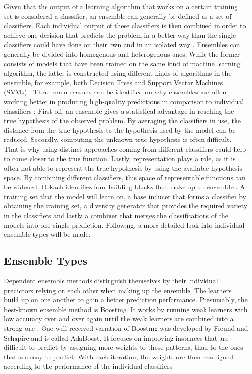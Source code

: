Given that the output of a learning algorithm that works on a certain training set is considered a classifier, an ensemble can generally be defined as a set of classifiers. Each individual output of these classifiers is then combined in order to achieve one decision that predicts the problem in a better way than the single classifiers could have done on their own and in an isolated way \cite{dietterich2000}. Ensembles can generally be divided into homogenous and heterogenous ones. While the former consists of models that have been trained on the same kind of machine learning algorithm, the latter is constructed using different kinds of algorithms in the ensemble, for example, both Decision Trees and Support Vector Machines (SVMs) \cite{zhou2012}. Three main reasons can be identified on why ensembles are often working better in producing high-quality predictions in comparison to individual classifiers \cite{dietterich2000}: First off, an ensemble gives a statistical advantage in reaching the true hypothesis of the observed problem. By averaging the classifiers in use, the distance from the true hypothesis to the hypothesis used by the model can be reduced. Secondly, computing the unknown true hypothesis is often difficult. That is why using distinct approaches coming from different classifiers could help to come closer to the true function. Lastly, representation plays a role, as it is often not able to represent the true hypothesis by using the available hypothesis space. By combining different classifiers, this space of representable functions can be widened. Rokach identifies four building blocks that make up an ensemble \cite{rokach2010}: A training set that the model will learn on, a base inducer that forms a classifier by obtaining the training set, a diversity generator that provides the required variety in the classifiers and lastly a combiner that merges the classifications of the models into one single prediction. Following, a more detailed look into individual ensemble types will be made.



\subsection{Ensemble Types}

Dependent ensemble methods distinguish themselves by their individual predictors relying on each other when making up the ensemble. The learners build up on one another to gain a better prediction performance. Presumably, the best-known ensemble method is Boosting. It works by running weak learners with low accuracy over and over again until the weak learners are combined into a strong one \cite{rokach2010}. One well-received variation of Boosting was developed by Freund and Schapire \cite{freund1995} and is called AdaBoost. It focuses on improving instances that are difficult to predict by assigning more weights to those patterns, than to the ones that are easy to predict. With each iteration, the weights are then reassigned according to the performance of the individual classifiers.

